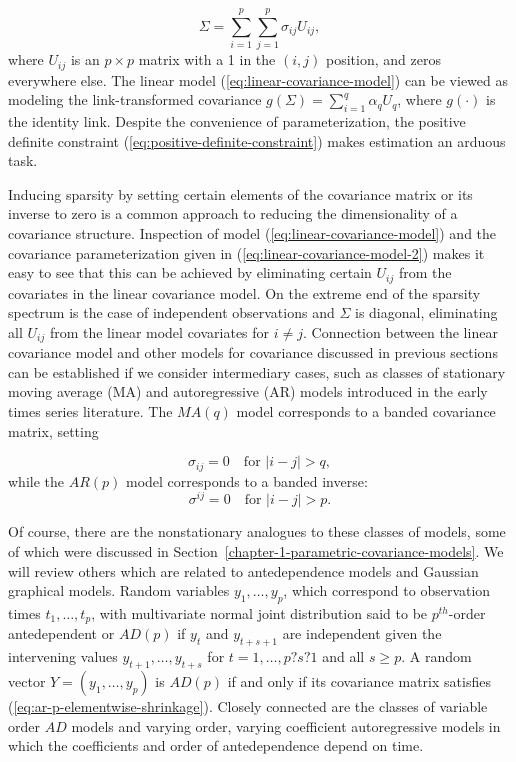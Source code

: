 \begin{equation} \label{eq:linear-covariance-model-2}	
\Sigma = \sum_{i = 1}^p \sum_{j = 1}^p \sigma_{ij} U_{ij},
\end{equation}
\noindent
where $U_{ij}$ is an $p \times p$ matrix with a 1 in the $\left(i,j\right)$ position, and zeros everywhere else. The linear model (\ref{eq:linear-covariance-model}) can be viewed as modeling the link-transformed covariance $g\left(\Sigma\right) =\sum_{i = 1}^q \alpha_qU_q$, where $g\left(\cdot\right)$ is the identity link. Despite the convenience of parameterization, the positive definite constraint (\ref{eq:positive-definite-constraint}) makes estimation an arduous task. 

\bigskip

Inducing sparsity by setting certain elements of the covariance matrix or its inverse to zero is a common approach to reducing the dimensionality of a covariance structure. Inspection of model (\ref{eq:linear-covariance-model}) and the covariance parameterization given in (\ref{eq:linear-covariance-model-2}) makes it easy to see that this can be achieved by eliminating certain $U_{ij}$ from the covariates in the linear covariance model. On the extreme end of the sparsity spectrum is the case of independent observations and $\Sigma$ is diagonal, eliminating all $U_{ij}$ from the linear model covariates for $i \ne j$. Connection between the linear covariance model and other models for covariance discussed in previous sections can be established if we consider intermediary cases, such as classes of stationary moving average (MA) and autoregressive (AR) models introduced in the early times series literature. The $MA(q)$ model corresponds to a banded covariance matrix, setting 

\begin{equation}  \label{eq:ar-p-elementwise-shrinkage}
\sigma_{ij} = 0 \quad \mbox{for }\vert i - j \vert > q, 
\end{equation}
\noindent
while the $AR(p)$ model corresponds to a banded inverse:
\begin{equation} \label{eq:ar-p-elementwise-shrinkage}
\sigma^{ij} = 0 \quad \mbox{for }\vert i - j \vert > p. 
\end{equation}

Of course, there are the nonstationary analogues to these classes of models, some of which were discussed in Section~\ref{chapter-1-parametric-covariance-models}. We will review others which are related to antedependence models and Gaussian graphical models. Random variables $y_1, \dots, y_p$, which correspond to observation times $t_1,\dots, t_p$, with multivariate normal joint distribution said to be $p^{th}$-order antedependent or $AD(p)$ \cite{gabriel1962ante} if $y_t$ and $y_{t+s+1}$ are independent given the intervening values $y_{t+1}, \dots , y_{t+s}$ for $t = 1, \dots , p?s?1$ and all $s \ge p$. A random vector $Y = \left(y_1, \dots , y_p\right)$ is $AD(p)$ if and only if its covariance matrix satisfies (\ref{eq:ar-p-elementwise-shrinkage}). Closely connected are the classes of variable order $AD$ models and varying order, varying coefficient autoregressive models \cite{kitagawa1985smoothness} in which the coefficients and order of antedependence depend on time. 


